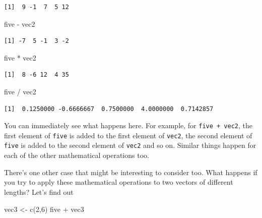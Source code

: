 \documentclass[
  letterpaper,
  DIV=11,
  numbers=noendperiod]{scrreprt}
\newenvironment{Shaded}{\begin{snugshade}}{\end{snugshade}}
\newcommand{\DecValTok}[1]{\textcolor[rgb]{0.68,0.00,0.00}{#1}}
\newcommand{\FunctionTok}[1]{\textcolor[rgb]{0.28,0.35,0.67}{#1}}
\newcommand{\NormalTok}[1]{\textcolor[rgb]{0.00,0.23,0.31}{#1}}
\newcommand{\OtherTok}[1]{\textcolor[rgb]{0.00,0.23,0.31}{#1}}
\newcommand{\SpecialCharTok}[1]{\textcolor[rgb]{0.37,0.37,0.37}{#1}}
\begin{document}
\begin{verbatim}
[1]  9 -1  7  5 12
\end{verbatim}

\begin{Shaded}
\begin{Highlighting}[]
\NormalTok{five }\SpecialCharTok{{-}}\NormalTok{ vec2}
\end{Highlighting}
\end{Shaded}

\begin{verbatim}
[1] -7  5 -1  3 -2
\end{verbatim}

\begin{Shaded}
\begin{Highlighting}[]
\NormalTok{five }\SpecialCharTok{*}\NormalTok{ vec2}
\end{Highlighting}
\end{Shaded}

\begin{verbatim}
[1]  8 -6 12  4 35
\end{verbatim}

\begin{Shaded}
\begin{Highlighting}[]
\NormalTok{five }\SpecialCharTok{/}\NormalTok{ vec2}
\end{Highlighting}
\end{Shaded}

\begin{verbatim}
[1]  0.1250000 -0.6666667  0.7500000  4.0000000  0.7142857
\end{verbatim}

You can immediately see what happens here. For example, for
\texttt{five\ +\ vec2}, the first element of \texttt{five} is added to
the first element of \texttt{vec2}, the second element of \texttt{five}
is added to the second element of \texttt{vec2} and so on. Similar
things happen for each of the other mathematical operations too.

There's one other case that might be interesting to consider too. What
happens if you try to apply these mathematical operations to two vectors
of different lengths? Let's find out

\begin{Shaded}
\begin{Highlighting}[]
\NormalTok{vec3 }\OtherTok{\textless{}{-}} \FunctionTok{c}\NormalTok{(}\DecValTok{2}\NormalTok{,}\DecValTok{6}\NormalTok{)}
\NormalTok{five }\SpecialCharTok{+}\NormalTok{ vec3}
\end{Highlighting}
\end{Shaded}
\end{document}

